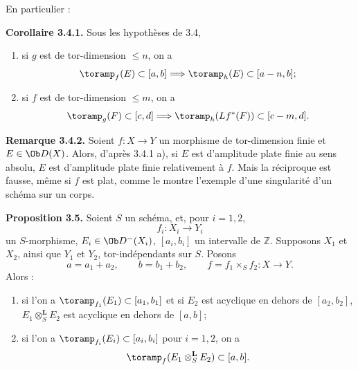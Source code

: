 \documentclass[11pt]{article}
\begin{document}
En particulier :

\textbf{Corollaire 3.4.1.} Sous les hypothèses de 3.4,
\begin{enumerate}[label=\alph*)]
\item si \(g\) est de tor-dimension \(\leq n\), on a
\[
  \toramp_f(E)\subset[a,b]\Longrightarrow\toramp_h(E)\subset[a-n,b];
\]
\item si \(f\) est de tor-dimension \(\leq m\), on a
\[
  \toramp_g(F)\subset[c,d]\Longrightarrow\toramp_h(Lf^*(F))\subset[c-m,d].
\]
\end{enumerate}

\textbf{Remarque 3.4.2.} Soient \(f:X\to Y\) un morphisme de tor-dimension finie et \(E\in\Ob D(X)\). Alors, d'après 3.4.1 a), si \(E\) est d'amplitude plate finie au sens absolu, \(E\) est d'amplitude plate finie relativement à \(f\). Mais la réciproque est fausse, même si \(f\) est plat, comme le montre l'exemple d'une singularité d'un schéma sur un corps.

\textbf{Proposition 3.5.} Soient \(S\) un schéma, et, pour \(i=1,2\),
\[
  f_i:X_i\longrightarrow Y_i
\]
un \(S\)-morphisme, \(E_i\in\Ob D^{-}(X_i)\), \([a_i,b_i]\) un intervalle de \(\mathbb Z\). Supposons \(X_1\) et \(X_2\), ainsi que \(Y_1\) et \(Y_2\), tor-indépendants sur \(S\). Posons
\[
  a=a_1+a_2,\qquad b=b_1+b_2,\qquad f=f_1\times_Sf_2:X\to Y.
\]
Alors :
\begin{enumerate}[label=\alph*)]
\item si l'on a \(\toramp_{f_1}(E_1)\subset[a_1,b_1]\) et si \(E_2\) est acyclique en dehors de \([a_2,b_2]\), \(E_1\otimes_S^{\mathbf L}E_2\) est acyclique en dehors de \([a,b]\);
\item si l'on a \(\toramp_{f_i}(E_i)\subset[a_i,b_i]\) pour \(i=1,2\), on a
\[
  \toramp_f(E_1\otimes_S^{\mathbf L}E_2)\subset[a,b].
\]
\end{enumerate}
\end{document}
